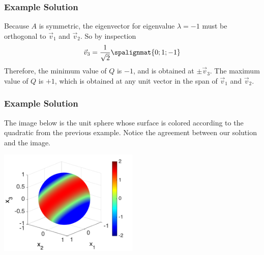 \begin{frame}\frametitle{Example Solution}    
    Because $A$ is symmetric, the eigenvector for eigenvalue $\lambda = -1$ must be orthogonal to $\vec v_1$ and $\vec v_2$. \pause So by inspection $$\vec v_3 = \frac{1}{\sqrt{2}}\spalignmat{0;1;-1}$$
    \pause Therefore, the minimum value of $Q$ is $-1$, and is obtained at $\pm \vec v_3$. \pause The maximum value of $Q$ is $+1$, which is obtained at any unit vector in the span of $\vec v_1$ and $\vec v_2$. 
\end{frame}


\begin{frame}\frametitle{Example Solution}    

    The image below is the unit sphere whose surface is colored according to the quadratic from the previous example. Notice the agreement between our solution and the image. 

    \begin{center}
        \includegraphics[width=0.5\textwidth]{Chapter7/images/sphere73example2.png} 
    \end{center}

\end{frame}




